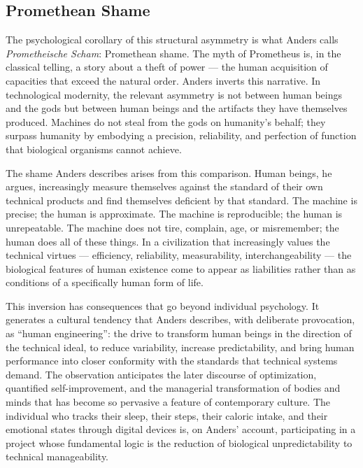 \documentclass[12pt]{memoir}
\begin{document}
\subsection{Promethean Shame}

The psychological corollary of this structural asymmetry is what Anders calls
\textit{Prometheische Scham}: Promethean shame. The myth of Prometheus is, in the classical
telling, a story about a theft of power — the human acquisition of capacities that exceed the
natural order. Anders inverts this narrative. In technological modernity, the relevant asymmetry
is not between human beings and the gods but between human beings and the artifacts they have
themselves produced. Machines do not steal from the gods on humanity's behalf; they surpass
humanity by embodying a precision, reliability, and perfection of function that biological
organisms cannot achieve.

The shame Anders describes arises from this comparison. Human beings, he argues, increasingly
measure themselves against the standard of their own technical products and find themselves
deficient by that standard. The machine is precise; the human is approximate. The machine is
reproducible; the human is unrepeatable. The machine does not tire, complain, age, or
misremember; the human does all of these things. In a civilization that increasingly values
the technical virtues — efficiency, reliability, measurability, interchangeability — the
biological features of human existence come to appear as liabilities rather than as conditions
of a specifically human form of life.\citep[23--95]{anders1956}

This inversion has consequences that go beyond individual psychology. It generates a cultural
tendency that Anders describes, with deliberate provocation, as \enquote{human engineering}: the
drive to transform human beings in the direction of the technical ideal, to reduce variability,
increase predictability, and bring human performance into closer conformity with the standards
that technical systems demand. The observation anticipates the later discourse of optimization,
quantified self-improvement, and the managerial transformation of bodies and minds that has
become so pervasive a feature of contemporary culture. The individual who tracks their sleep,
their steps, their caloric intake, and their emotional states through digital devices is, on
Anders' account, participating in a project whose fundamental logic is the reduction of
biological unpredictability to technical manageability.
\end{document}
